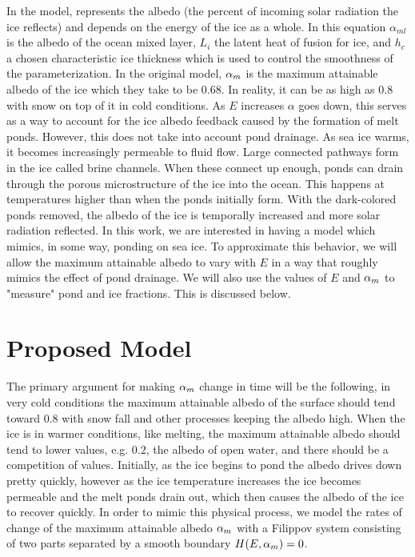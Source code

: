 \par In the model,  represents the albedo (the percent of incoming solar radiation the ice reflects) and depends on the energy of the ice as a whole. In this equation $\alpha_{ml}$ is the albedo of the ocean mixed layer, $L_i$ the latent heat of fusion for ice, and $h_c$ a chosen characteristic ice thickness which is used to control the smoothness of the parameterization. In the original model, $\alpha_m$ is the maximum attainable albedo of the ice which they take to be $0.68$. In reality, it can be as high as $0.8$ with snow on top of it in cold conditions. As $E$ increases $\alpha$ goes down, this serves as a way to account for the ice albedo feedback caused by the formation of melt ponds. However, this does not take into account pond drainage. As sea ice warms, it becomes increasingly permeable to fluid flow. Large connected pathways form in the ice called brine channels. When these connect up enough, ponds can drain through the porous microstructure of the ice into the ocean. This happens at temperatures higher than when the ponds initially form. With the dark-colored ponds removed, the albedo of the ice is temporally increased and more solar radiation reflected. In this work, we are interested in having a model which mimics, in some way, ponding on sea ice. To approximate this behavior, we will allow the maximum attainable albedo to vary with $E$ in a way that roughly mimics the effect of pond drainage. We will also use the values of $E$ and $\alpha_m$ to "measure" pond and ice fractions. This is discussed below.  

\section{Proposed Model}

\par The primary argument for making $\alpha_m$ change in time will be the following, in very cold conditions the maximum attainable albedo of the surface should tend toward $0.8$ with snow fall and other processes keeping the albedo high. When the ice is in warmer conditions, like melting, the maximum attainable albedo should tend to lower values, e.g. $0.2$, the albedo of open water, and there should be a competition of values. Initially, as the ice begins to pond the albedo drives down pretty quickly, however as the ice temperature increases the ice becomes permeable and the melt ponds drain out, which then causes the albedo of the ice to recover quickly. In order to mimic this physical process, we model the rates of change of the maximum attainable albedo $\alpha_m$ with a Filippov system \cite{Filippov} consisting of two parts separated by a smooth boundary $H(E,\alpha_m)=0$. 

